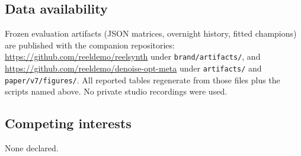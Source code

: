 \subsection{Data availability}
\label{sec:data-availability}
Frozen evaluation artifacts (JSON matrices, overnight history, fitted champions) are published with the companion repositories:
\url{https://github.com/reeldemo/reelsynth} under \texttt{brand/artifacts/}, and
\url{https://github.com/reeldemo/denoise-opt-meta} under \texttt{artifacts/} and \texttt{paper/v7/figures/}.
All reported tables regenerate from those files plus the scripts named above.
No private studio recordings were used.

\subsection{Competing interests}
\label{sec:competing}
None declared.
